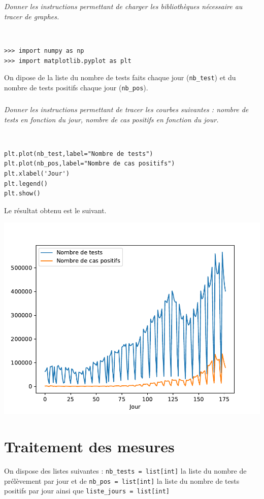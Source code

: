 \documentclass[10pt,fleqn]{article} %
\begin{document}
\subparagraph{}
\textit{Donner les instructions permettant de charger les bibliothèques nécessaire au tracer de graphes.}
\ifprof
\begin{corrige}~\\
\begin{lstlisting}
>>> import numpy as np
>>> import matplotlib.pyplot as plt
\end{lstlisting}
\end{corrige}
\else
\fi

On dipose de la liste du nombre de tests faits chaque jour (\texttt{nb\_test}) et du nombre de tests positifs chaque jour  (\texttt{nb\_pos}).

\subparagraph{}
\textit{Donner les instructions permettant de tracer les courbes suivantes : nombre de tests en fonction du jour, nombre de cas positifs en fonction du jour.}
\ifprof
\begin{corrige}~\\
\begin{lstlisting}
plt.plot(nb_test,label="Nombre de tests")
plt.plot(nb_pos,label="Nombre de cas positifs")
plt.xlabel('Jour')
plt.legend()
plt.show()
\end{lstlisting}
\end{corrige}
\else
\fi

\ifprof
\else
Le résultat obtenu est le suivant. 

\begin{center}
\includegraphics[width=.6\linewidth]{images/Figure_1.pdf}
\end{center}
\fi

\section{Traitement des mesures}
\ifprof
\else
On dispose des listes suivantes : \texttt{nb\_tests = list[int]} la liste du nombre de prélèvement par jour et de \texttt{nb\_pos = list[int]} la liste du nombre de tests positifs par jour ainsi que  \texttt{liste\_jours = list[int]}
\fi
\end{document}
